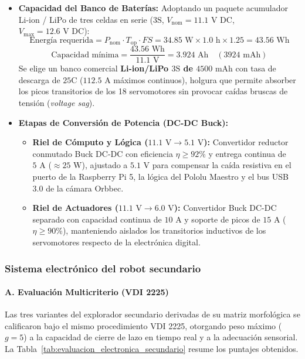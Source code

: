 \begin{itemize}
    \item \textbf{Capacidad del Banco de Baterías:} Adoptando un paquete acumulador Li-ion / LiPo de tres celdas en serie ($3\text{S}$, $V_{\text{nom}} = 11.1\text{ V DC}$, $V_{\text{max}} = 12.6\text{ V DC}$):
    \begin{equation}
        \text{Energía requerida} = P_{\text{nom}} \cdot T_{\text{op}} \cdot FS = 34.85\text{ W} \times 1.0\text{ h} \times 1.25 = 43.56\text{ Wh}
    \end{equation}
    \begin{equation}
        \text{Capacidad mínima} = \frac{43.56\text{ Wh}}{11.1\text{ V}} = 3.924\text{ Ah} \quad (3924\text{ mAh})
    \end{equation}
    Se elige un banco comercial \textbf{Li-ion/LiPo $3\text{S}$ de $4500\text{ mAh}$} con tasa de descarga de $25\text{C}$ ($112.5\text{ A}$ máximos continuos), holgura que permite absorber los picos transitorios de los 18 servomotores sin provocar caídas bruscas de tensión (\textit{voltage sag}).

    \item \textbf{Etapas de Conversión de Potencia (DC-DC Buck):}
    \begin{itemize}
        \item \textbf{Riel de Cómputo y Lógica ($11.1\text{ V} \to 5.1\text{ V}$):} Convertidor reductor conmutado Buck DC-DC con eficiencia $\eta \ge 92\%$ y entrega continua de $5\text{ A}$ ($\approx 25\text{ W}$), ajustado a $5.1\text{ V}$ para compensar la caída resistiva en el puerto de la Raspberry Pi 5, la lógica del Pololu Maestro y el bus USB 3.0 de la cámara Orbbec.
        \item \textbf{Riel de Actuadores ($11.1\text{ V} \to 6.0\text{ V}$):} Convertidor Buck DC-DC separado con capacidad continua de $10\text{ A}$ y soporte de picos de $15\text{ A}$ ($\eta \ge 90\%$), manteniendo aislados los transitorios inductivos de los servomotores respecto de la electrónica digital.
    \end{itemize}
\end{itemize}


\subsubsection{Sistema electrónico del robot secundario}

\paragraph{A. Evaluación Multicriterio (VDI 2225)}
Las tres variantes del explorador secundario derivadas de su matriz morfológica se calificaron bajo el mismo procedimiento VDI 2225, otorgando peso máximo ($g = 5$) a la capacidad de cierre de lazo en tiempo real y a la adecuación sensorial. La Tabla~\ref{tab:evaluacion_electronica_secundario} resume los puntajes obtenidos.

